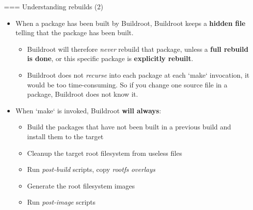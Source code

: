 === {Understanding rebuilds (2)}
  \begin{itemize}
  \item When a package has been built by Buildroot, Buildroot keeps a
    {\bf hidden file} telling that the package has been built.
    \begin{itemize}
    \item Buildroot will therefore {\em never} rebuild that package,
      unless a {\bf full rebuild is done}, or this specific package is
      {\bf explicitly rebuilt}.
    \item Buildroot does not {\em recurse} into each package at each
      `make` invocation, it would be too time-consuming. So if
      you change one source file in a package, Buildroot does not know
      it.
    \end{itemize}
  \item When `make` is invoked, Buildroot {\bf will always}:
    \begin{itemize}
    \item Build the packages that have not been built in a previous
      build and install them to the target
    \item Cleanup the target root filesystem from useless files
    \item Run {\em post-build} scripts, copy {\em rootfs overlays}
    \item Generate the root filesystem images
    \item Run {\em post-image} scripts
    \end{itemize}
  \end{itemize}


